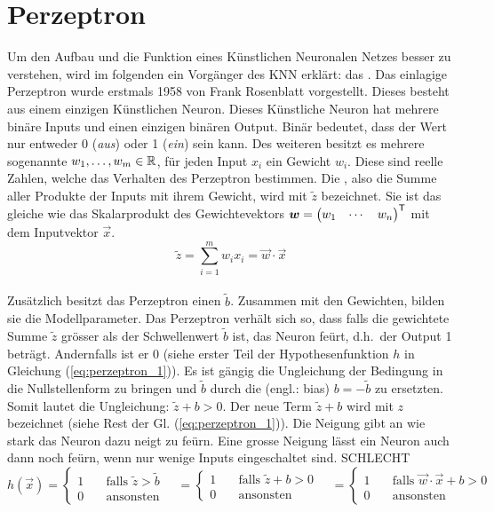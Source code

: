 \section{Perzeptron}
Um den Aufbau und die Funktion eines Künstlichen Neuronalen Netzes besser zu
verstehen, wird im folgenden ein Vorgänger des KNN erklärt: das .
\para{}
Das einlagige Perzeptron wurde erstmals 1958 von Frank Rosenblatt vorgestellt. Dieses
besteht aus einem einzigen Künstlichen Neuron. Dieses Künstliche Neuron
hat mehrere binäre Inputs und einen einzigen binären Output. Binär
bedeutet, dass der Wert nur entweder 0 (\textit{aus}) oder 1 (\textit{ein}) sein
kann. Des weiteren besitzt es mehrere sogenannte  $w_1, \ldots,
w_m \in \mathbb{R}$, für jeden Input $x_i$ ein Gewicht $w_i$.
Diese sind reelle Zahlen, welche das Verhalten des Perzeptron bestimmen.
Die , also die Summe aller Produkte der Inputs mit
ihrem Gewicht, wird mit $\tilde{z}$ bezeichnet.
Sie ist das gleiche wie das Skalarprodukt des Gewichtevektors
$\bm{w} = \begin{pmatrix} w_1 & \cdots & w_n \end{pmatrix}^{\mathsf{T}}$ mit dem
Inputvektor $\vec{x}$. \\
\begin{equation*}
  \tilde{z} = \sum_{i=1}^{m} w_i x_i = \vec{w} \cdot \vec{x}
\end{equation*} \\
Zusätzlich besitzt das Perzeptron einen  $\tilde{b}$.
Zusammen mit den Gewichten, bilden sie die Modellparameter.
Das Perzeptron verhält sich so, dass falls die gewichtete Summe $\tilde{z}$ grösser als der
Schwellenwert $\tilde{b}$ ist, das Neuron feürt, d.h.\ der Output 1 beträgt.
Andernfalls ist er 0 (siehe erster Teil der Hypothesenfunktion $h$ in Gleichung (\ref{eq:perzeptron_1})).
Es ist gängig die Ungleichung der Bedingung in die Nullstellenform zu bringen
und $\tilde{b}$ durch die  (engl.: bias)
$b = -\tilde{b}$ zu ersetzten. Somit lautet die Ungleichung: $\tilde{z} + b
> 0$. Der neue Term $\tilde{z} + b$ wird mit $z$ bezeichnet (siehe Rest der Gl. (\ref{eq:perzeptron_1})).
Die Neigung gibt an wie stark das Neuron dazu neigt zu feürn. Eine grosse
Neigung lässt ein Neuron auch dann noch feürn, wenn nur wenige Inputs
eingeschaltet sind. SCHLECHT \\
\begin{equation}\label{eq:perzeptron_1}
  h(\vec{x}) =
  \begin{cases}
    1 & \quad \text{falls } \tilde{z} > \tilde{b}\\
    0 & \quad \text{ansonsten}
  \end{cases}
  \quad =
  \begin{cases}
    1 & \quad \text{falls } \tilde{z} + b > 0\\
    0 & \quad \text{ansonsten}
  \end{cases}
  \quad =
  \begin{cases}
    1 & \quad\text{falls } \vec{w} \cdot \vec{x} + b > 0\\
    0 & \quad\text{ansonsten}
  \end{cases}
\end{equation}
